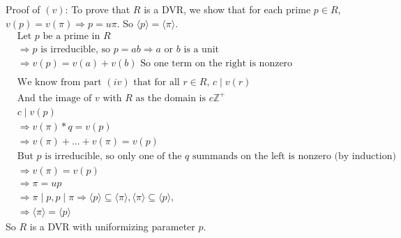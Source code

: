 \documentclass[11pt]{article}
\newcommand{\B}[1]{%
	\mathbb{#1}
}
\begin{document}
{Proof of $(v)$:
To prove that $R$ is a DVR, we show that for each prime $p \in R$, $v(p) = v(\pi) \Rightarrow p = u\pi$. So $\langle p \rangle = \langle \pi \rangle$.
\begin{align*}
&\text{Let $p$ be a prime in $R$}\\
&\Rightarrow p \text{ is irreducible, so } p = ab \Rightarrow \text{$a$ or $b$ is a unit}\\
&\Rightarrow v(p) = v(a) + v(b) \text{ So one term on the right is nonzero}\\
&\\
&\text{We know from part $(iv)$ that for all $r \in R$, $c \mid v(r)$}\\
&\text{And the image of $v$ with $R$ as the domain is $c\B{Z}^+$}\\
&c \mid v(p)\\
&\Rightarrow v(\pi)*q = v(p)\\
&\Rightarrow v(\pi) + ... + v(\pi) = v(p)\\
&\text{But $p$ is irreducible, so only one of the $q$ summands on the left is nonzero (by induction)}\\
&\Rightarrow v(\pi) = v(p)\\
&\Rightarrow \pi = up\\
&\Rightarrow \pi \mid p, p \mid \pi \Rightarrow \langle p \rangle \subseteq \langle \pi \rangle, \langle \pi \rangle \subseteq \langle p \rangle,\\
&\Rightarrow \langle \pi \rangle = \langle p \rangle
\end{align*}
So $R$ is a DVR with uniformizing parameter $p$.

}
\end{document}
